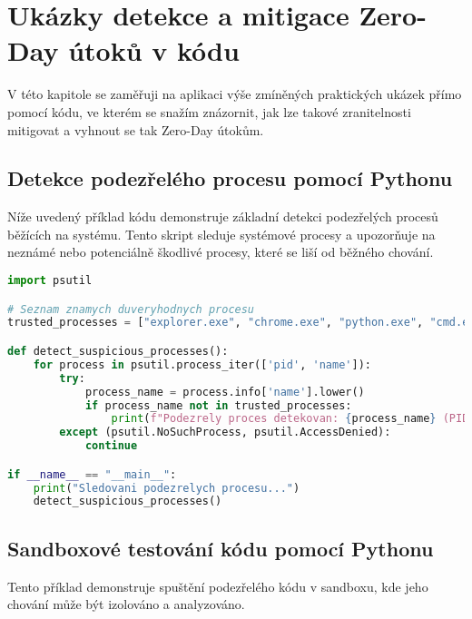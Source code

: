 \documentclass[11pt, conference, a4paper]{IEEEtran}
\begin{document}
\section{Ukázky detekce a mitigace Zero-Day útoků v k\' odu}

V této kapitole se zaměřuji na aplikaci výše zmíněných praktických ukázek přímo pomocí k\' odu, ve kterém se snažím znázornit, jak lze takové zranitelnosti mitigovat a vyhnout se tak Zero-Day \' utok\r um.

\subsection{Detekce podezřelého procesu pomocí Pythonu}

Níže uvedený příklad kódu demonstruje základní detekci podezřelých procesů běžících na systému. Tento skript sleduje systémové procesy a upozorňuje na neznámé nebo potenciálně škodlivé procesy, které se liší od běžného chování.

\begin{lstlisting}[language=Python, caption={Detekce podezřelých procesů pomocí Pythonu}, linewidth=\columnwidth]
import psutil

# Seznam znamych duveryhodnych procesu
trusted_processes = ["explorer.exe", "chrome.exe", "python.exe", "cmd.exe"]

def detect_suspicious_processes():
    for process in psutil.process_iter(['pid', 'name']):
        try:
            process_name = process.info['name'].lower()
            if process_name not in trusted_processes:
                print(f"Podezrely proces detekovan: {process_name} (PID: {process.info['pid']})")
        except (psutil.NoSuchProcess, psutil.AccessDenied):
            continue

if __name__ == "__main__":
    print("Sledovani podezrelych procesu...")
    detect_suspicious_processes()
\end{lstlisting}

\subsection{Sandboxové testování kódu pomocí Pythonu}

Tento příklad demonstruje spuštění podezřelého kódu v sandboxu, kde jeho chování může být izolováno a analyzováno.
\end{document}
